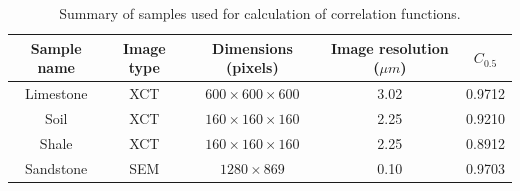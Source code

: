 \documentclass[1p]{elsarticle}
\begin{document}
\begin{table}[!htp]
  \centering
  \begin{tabular}{|c|c|c|c|c|}
    \hline
    Sample name & Image type & Dimensions (pixels) & Image resolution ($\mu m$) & $C_{0.5}$\\
    \hline
    Limestone & XCT &  $600 \times 600 \times 600$ & 3.02 & 0.9712 \\
    Soil & XCT & $160 \times 160 \times 160$ & 2.25 & 0.9210 \\
    Shale & XCT & $160 \times 160 \times 160$ & 2.25 & 0.8912 \\
    Sandstone & SEM &  $1280 \times 869$ & 0.10 & 0.9703 \\
    \hline
  \end{tabular}
  \caption{Summary of samples used for calculation of correlation functions.}
  \label{tab:summary}
\end{table}
\end{document}
